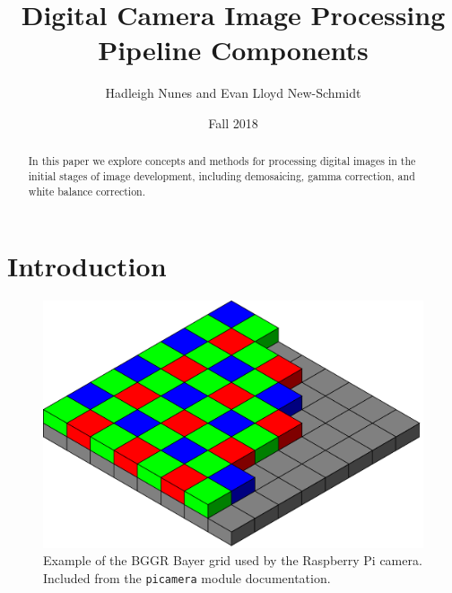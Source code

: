 \documentclass{article}\twocolumn
\title{Digital Camera Image Processing Pipeline Components}
\author{Hadleigh Nunes and Evan Lloyd New-Schmidt}
\date{Fall 2018}
\begin{document}
\maketitle


\begin{abstract}
    In this paper we explore concepts and methods for processing digital images in the initial stages of image development, including demosaicing, gamma correction, and white balance correction.
\end{abstract}

\section{Introduction}



\begin{figure}[!h]
    \centering
    \includegraphics[width=\columnwidth]{bggr_bayer_pattern}
    \caption{Example of the BGGR Bayer grid used by the Raspberry Pi camera. Included from the \lstinline{picamera} module documentation\cite{picameradocs}.}
    \label{fig:my_label}
\end{figure}



\end{document}
